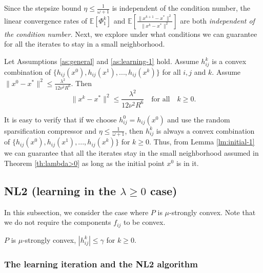 \documentclass[10pt]{article}
\newcommand{\newalpha}{h}
\begin{document}
Since the stepsize bound $\eta \leq \frac{1}{\omega+1}$ is independent of the condition number, the linear convergence rates of $\mathbb{E}[\Phi_1^k]$ and $ \mathbb{E} \left[  \frac{\|x^{k+1} - x^*\|^2}{\|x^k - x^*\|^2 }  \right]$ are both {\em independent of the condition number.} Next, we explore under what conditions we can guarantee for all the iterates to stay in a small neighborhood. 

\begin{lemma}\label{lm:initial-1}
Let Assumptions \ref{as:general} and \ref{as:learning-1} hold. Assume $h_{ij}^k$ is a convex combination of $\{  \newalpha_{ij}(x^0), \newalpha_{ij}(x^1), ..., \newalpha_{ij}(x^k)  \}$ for all $i,j$ and $k$. Assume $\|x^0 - x^*\|^2 \leq \frac{\lambda^2}{12\nu^2R^6}$. Then $$
\|x^k - x^*\|^2 \leq \frac{\lambda^2}{12\nu^2R^6} \quad \text{for all} \quad k\geq 0.
$$ 
\end{lemma}


It is easy to verify that if we choose $h_{ij}^0 = \newalpha_{ij}(x^0)$ and use the random sparsification compressor and $\eta \leq \frac{1}{\omega + 1}$, then $h_{ij}^k$ is always a convex combination of $\{  \newalpha_{ij}(x^0), \newalpha_{ij}(x^1), ..., \newalpha_{ij}(x^k)  \}$ for $k\geq 0$. Thus, from Lemma \ref{lm:initial-1} we can guarantee that all the iterates stay in the small neighborhood assumed in Theorem \ref{th:lambda>0} as long as the initial point $x^0$ is in it.  



\subsection{{\sf NL2} (learning in the $\lambda \geq 0$ case)} \label{subsec:NL2}

In this subsection, we consider the case where $P$ is $\mu$-strongly convex. Note that we do not require the components $f_{ij}$ to be convex. 
\begin{assumption}\label{as:learning-2}
 $P$ is $\mu$-strongly convex, $|h_{ij}^k| \leq \gamma$ for $k\geq 0$. \end{assumption}


\subsubsection{The learning iteration and the {\sf NL2} algorithm}
\end{document}
